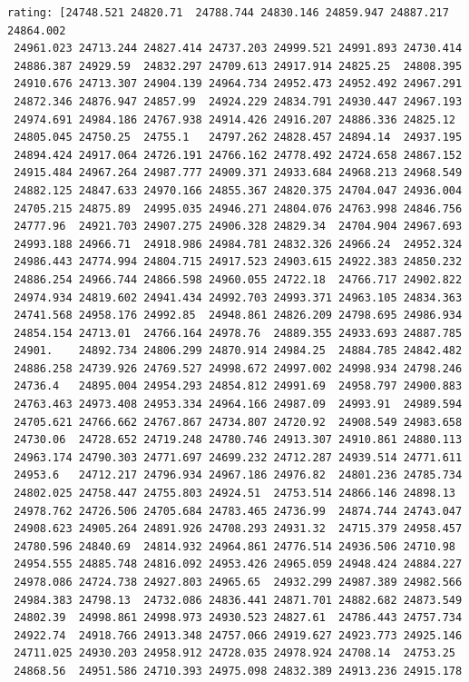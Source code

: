 \documentclass[11pt]{article}
\begin{document}
\begin{Verbatim}[commandchars=\\\{\}]
rating: [24748.521 24820.71  24788.744 24830.146 24859.947 24887.217 24864.002
 24961.023 24713.244 24827.414 24737.203 24999.521 24991.893 24730.414
 24886.387 24929.59  24832.297 24709.613 24917.914 24825.25  24808.395
 24910.676 24713.307 24904.139 24964.734 24952.473 24952.492 24967.291
 24872.346 24876.947 24857.99  24924.229 24834.791 24930.447 24967.193
 24974.691 24984.186 24767.938 24914.426 24916.207 24886.336 24825.12
 24805.045 24750.25  24755.1   24797.262 24828.457 24894.14  24937.195
 24894.424 24917.064 24726.191 24766.162 24778.492 24724.658 24867.152
 24915.484 24967.264 24987.777 24909.371 24933.684 24968.213 24968.549
 24882.125 24847.633 24970.166 24855.367 24820.375 24704.047 24936.004
 24705.215 24875.89  24995.035 24946.271 24804.076 24763.998 24846.756
 24777.96  24921.703 24907.275 24906.328 24829.34  24704.904 24967.693
 24993.188 24966.71  24918.986 24984.781 24832.326 24966.24  24952.324
 24986.443 24774.994 24804.715 24917.523 24903.615 24922.383 24850.232
 24886.254 24966.744 24866.598 24960.055 24722.18  24766.717 24902.822
 24974.934 24819.602 24941.434 24992.703 24993.371 24963.105 24834.363
 24741.568 24958.176 24992.85  24948.861 24826.209 24798.695 24986.934
 24854.154 24713.01  24766.164 24978.76  24889.355 24933.693 24887.785
 24901.    24892.734 24806.299 24870.914 24984.25  24884.785 24842.482
 24886.258 24739.926 24769.527 24998.672 24997.002 24998.934 24798.246
 24736.4   24895.004 24954.293 24854.812 24991.69  24958.797 24900.883
 24763.463 24973.408 24953.334 24964.166 24987.09  24993.91  24989.594
 24705.621 24766.662 24767.867 24734.807 24720.92  24908.549 24983.658
 24730.06  24728.652 24719.248 24780.746 24913.307 24910.861 24880.113
 24963.174 24790.303 24771.697 24699.232 24712.287 24939.514 24771.611
 24953.6   24712.217 24796.934 24967.186 24976.82  24801.236 24785.734
 24802.025 24758.447 24755.803 24924.51  24753.514 24866.146 24898.13
 24978.762 24726.506 24705.684 24783.465 24736.99  24874.744 24743.047
 24908.623 24905.264 24891.926 24708.293 24931.32  24715.379 24958.457
 24780.596 24840.69  24814.932 24964.861 24776.514 24936.506 24710.98
 24954.555 24885.748 24816.092 24953.426 24965.059 24948.424 24884.227
 24978.086 24724.738 24927.803 24965.65  24932.299 24987.389 24982.566
 24984.383 24798.13  24732.086 24836.441 24871.701 24882.682 24873.549
 24802.39  24998.861 24998.973 24930.523 24827.61  24786.443 24757.734
 24922.74  24918.766 24913.348 24757.066 24919.627 24923.773 24925.146
 24711.025 24930.203 24958.912 24728.035 24978.924 24708.14  24753.25
 24868.56  24951.586 24710.393 24975.098 24832.389 24913.236 24915.178

\end{Verbatim}
\end{document}
